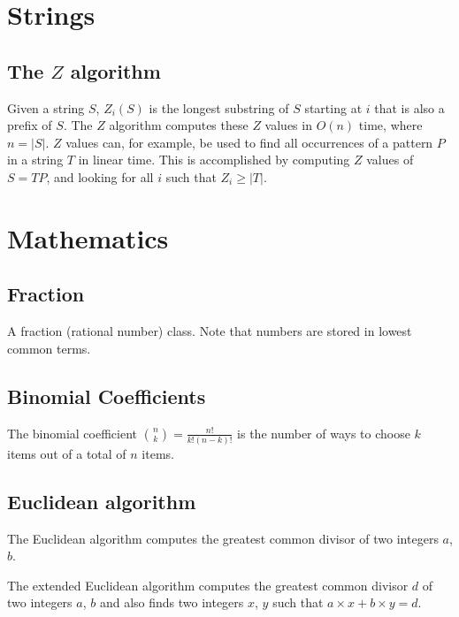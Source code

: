 \documentclass[10pt,a4paper,titlepage]{article}
\begin{document}
\section{Strings}
\subsection{The $Z$ algorithm}
Given a string $S$, $Z_i(S)$ is the longest substring of $S$ starting at $i$ that is also a prefix of $S$. The $Z$ algorithm computes these $Z$ values in $O(n)$ time, where $n = |S|$. $Z$ values can, for example, be used to find all occurrences of a pattern $P$ in a string $T$ in linear time. This is accomplished by computing $Z$ values of $S = T P$, and looking for all $i$ such that $Z_i \geq |T|$.



\section{Mathematics}

\subsection{Fraction}
A fraction (rational number) class. Note that numbers are stored in lowest common terms.


\subsection{Binomial Coefficients}
The binomial coefficient $\binom{n}{k} = \frac{n!}{k!(n-k)!}$ is the number of ways to choose $k$ items out of a total of $n$ items.





\subsection{Euclidean algorithm}
The Euclidean algorithm computes the greatest common divisor of two integers $a$, $b$.


The extended Euclidean algorithm computes the greatest common divisor $d$ of two integers $a$, $b$ and also finds two integers $x$, $y$ such that $a\times x + b\times y = d$.

\end{document}
